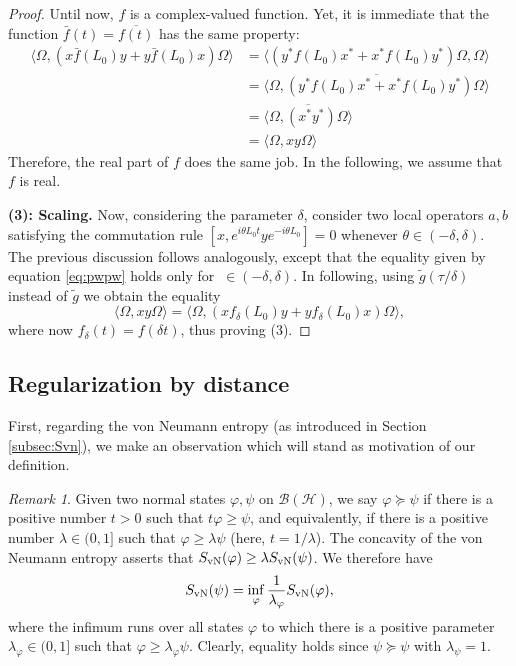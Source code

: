 \documentclass[a4paper,12pt]{article}
\theoremstyle{plain}
\theoremstyle{definition}
\theoremstyle{remark}
\newtheorem{remark}[theo]{Remark}
\newcommand{\inner}  [2]{\langle #1 , #2 \rangle}
\newcommand{\binner} [2]{\big\langle #1 , #2 \big\rangle}
\newcommand{\Svn}{S_{\rm vN}}
\def\B{{\mathcal B}}
\def\H{{\mathcal H}}
\begin{document}
\begin{proof}
Until now, $f$ is a complex-valued function.
Yet, it is immediate that the function $\bar f(t) = \overline{f(t)}$
has the same property:
\begin{align*}
\binner{\Omega}{(x\bar f(L_0)y + y\bar f(L_0)x) \Omega} &= \binner{(y^*f(L_0)x^* + x^*f(L_0)y^*) \Omega}{\Omega} \\
&= \overline{\binner{\Omega}{(y^*f(L_0)x^* + x^*f(L_0)y^*) \Omega}} \\
&= \overline{\binner{\Omega}{(x^*y^*) \Omega}} \\
&= \binner{\Omega}{xy \Omega}
\end{align*}
Therefore, the real part of $f$ does the same job.
In the following, we assume that $f$ is real.

{\bf (3): Scaling.} Now, considering the parameter $\delta$, consider two local operators $a,b$
satisfying the commutation rule $[x,e^{i\theta L_0t}ye^{-i\theta L_0}] = 0$ whenever $\theta \in (-\delta,\delta)$.
The previous discussion follows analogously, except that the equality given by
equation \eqref{eq:pwpw} holds only for $\ \in (-\delta,\delta)$.
In following, using $\tilde{g}(\tau/\delta)$  instead of $\tilde{g}$ we obtain the equality
\begin{equation*}%
\inner{\Omega}{xy\Omega} = \binner{\Omega}{(xf_\delta(L_0)y + yf_\delta(L_0)x) \Omega}, 
\end{equation*}
where now $f_\delta(t) = f(\delta t)$, thus proving (3).
\end{proof}


\subsection{Regularization by distance}\label{subsec:cutdef}



First, regarding the von Neumann entropy (as introduced in Section \ref{subsec:Svn}), we make an observation which will stand as motivation of our definition.

\begin{remark} Given two normal states $\varphi,\psi$ on $\B(\H)$, we say $\varphi\succeq\psi$ if there is a positive number $t>0$ such that $t\varphi \ge \psi$, and equivalently, if there is a positive number $\lambda \in (0,1]$ such that $\varphi \ge \lambda \psi$ (here, $t = 1/\lambda$). The concavity of the von Neumann entropy asserts that $\Svn(\varphi) \ge \lambda \Svn(\psi)$. We therefore have
\[ \Svn(\psi) = \inf_{\varphi} \frac{1}{\lambda_\varphi}\Svn(\varphi), \]
where the infimum runs over all states $\varphi$ to which there is a positive parameter $\lambda_\varphi \in (0,1]$ such that $\varphi \ge \lambda_\varphi \psi$. Clearly, equality holds since $\psi \succeq \psi$ with $\lambda_\psi = 1$.
\end{remark}
\end{document}
